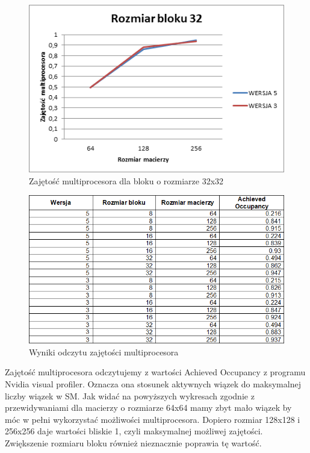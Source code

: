 \documentclass{article}
\begin{document}
\begin{figure}[H]
	\centering
	\includegraphics[width=\linewidth]{./images/graphs/zajetosc/graph3.png}
	\caption{Zajętość multiprocesora dla bloku o rozmiarze 32x32}
	\label{fig:graphz3}
\end{figure}

\begin{figure}[H]
	\centering
	\includegraphics[width=\linewidth]{./images/tables/table2.png}
	\caption{Wyniki odczytu zajętości multiprocesora}
	\label{fig:table2}
\end{figure}

Zajętość multiprocesora odczytujemy z wartości Achieved Occupancy z programu Nvidia visual profiler. Oznacza ona stosunek aktywnych wiązek do maksymalnej liczby wiązek w SM. Jak widać na powyższych wykresach zgodnie z przewidywaniami dla macierzy o rozmiarze 64x64 mamy zbyt mało wiązek by móc w pełni wykorzystać możliwości multiprocesora. Dopiero rozmiar 128x128 i 256x256 daje wartości bliskie 1, czyli maksymalnej możliwej zajętości. Zwiększenie rozmiaru bloku również nieznacznie poprawia tę wartość.
\end{document}
